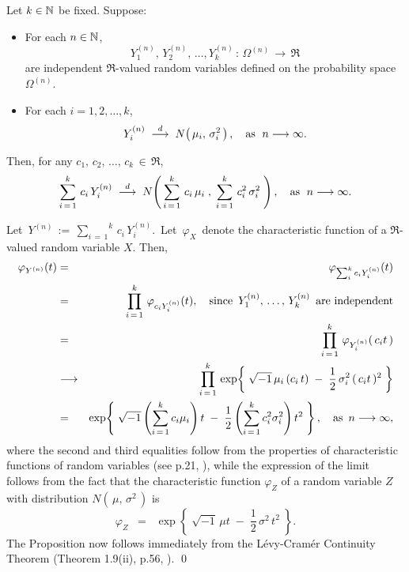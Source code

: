 \begin{proposition}
\label{GaussianDistributionLimit}
\quad
Let $k \in \mathbb{N}$ be fixed.
Suppose:
\begin{itemize}
\item	For each $n \in \mathbb{N}$,
		\begin{equation*}
		Y^{(n)}_{1},\, Y^{(n)}_{2},\, \ldots, Y^{(n)}_{k} \,:\,\Omega^{(n)}\,\longrightarrow\,\Re
		\end{equation*}
		are independent $\Re$-valued random variables defined on the probability space $\Omega^{(n)}$.
\item	For each $i = 1, 2, \ldots, k$,
		\begin{equation*}
		Y^{(n)}_{i} \; \overset{d}{\longrightarrow} \; N\!\left(\,\mu_{i},\,\sigma^{2}_{i}\,\right),
		\quad
		\textnormal{as \;$n \longrightarrow \infty$}.
		\end{equation*}
\end{itemize}
Then, for any $c_{1},\, c_{2},\, \ldots,\, c_{k} \,\in\, \Re$,
\begin{equation*}
\sum_{i\,=\,1}^{k}\,c_{i}\,Y^{(n)}_{i} \; \overset{d}{\longrightarrow} \;
N\!\left(\,\sum_{i\,=\,1}^{k}\,c_{i}\,\mu_{i} \;,\; \sum_{i\,=\,1}^{k}\,c_{i}^{2}\,\sigma_{i}^{2}\;\right),
\quad
\textnormal{as \;$n \longrightarrow \infty$}.
\end{equation*}
\end{proposition}
\proof
Let \,$Y^{(n)} \,:=\, \overset{k}{\underset{i\,=\,1}{\sum}}\,c_{i}\,Y^{(n)}_{i}$.\,
Let \,$\varphi_{X}$\, denote the characteristic function of a $\Re$-valued random variable $X$.
Then,
\begin{eqnarray*}
\varphi_{Y^{(n)}}(t)
&=& \varphi_{\sum_{i}^{k}c_{i}Y^{(n)}_{i}}(t)
\\
&=& \prod_{i\,=\,1}^{k}\,\varphi_{c_{i}Y^{(n)}_{i}}(t),
\quad\textnormal{since \,$Y^{(n)}_{1},\, \ldots,\, Y^{(n)}_{k}$\, are independent}
\\
&=& \prod_{i\,=\,1}^{k}\,\varphi_{Y^{(n)}_{i}}(\,c_{i}t\,)
\\
&\longrightarrow&
\prod_{i\,=\,1}^{k}\,\exp\!\left\{\;\sqrt{-1}\,\mu_{i}\,(c_{i}\,t) \;-\; \dfrac{1}{2}\,\sigma_{i}^{2}\,(\,c_{i}t\,)^{2}\;\right\}
\\
&=&
\exp\!\left\{\;
	\sqrt{-1}\left(\sum_{i\,=\,1}^{k}c_{i}\mu_{i}\right)t
	\;-\; \dfrac{1}{2}\left(\sum_{i\,=\,1}^{k}c_{i}^{2}\sigma_{i}^{2}\right)t^{2}
	\;\right\},
\quad\textnormal{as \,$n \longrightarrow \infty$},
\end{eqnarray*}
where the second and third equalities follow from the properties of
characteristic functions of random variables (see p.21, \cite{Ferguson1996}),
while the expression of the limit follows from the fact that the characteristic
function $\varphi_{Z}$ of a random variable $Z$ with distribution
$N\!\left(\,\mu,\,\sigma^{2}\,\right)$ is
\begin{equation*}
\varphi_{Z}
\;\;=\;\;
\exp\!\left\{\;\sqrt{-1}\,\mu t \;-\; \dfrac{1}{2}\,\sigma^{2}\,t^{2}\;\right\}.
\end{equation*}
The Proposition now follows immediately from
the L\'{e}vy-Cram\'{e}r Continuity Theorem (Theorem 1.9(ii), p.56, \cite{Shao2003}).
\qed

